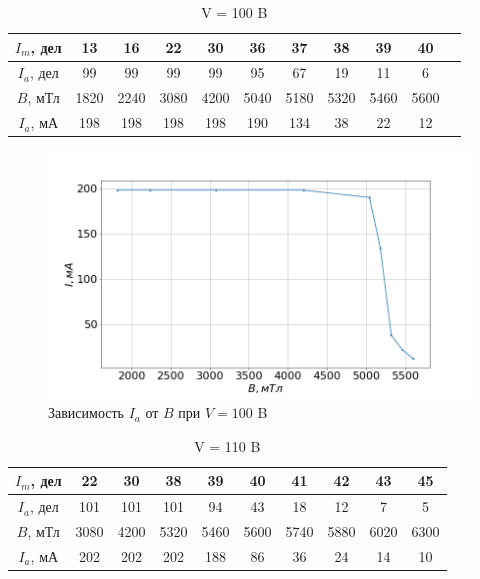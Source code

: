 \documentclass[a4paper, fontsize=14pt]{article}
\begin{document}
\begin{table}[H]

	\centering
\begin{tabular}{|c|c|c|c|c|c|c|c|c|c|c|}
     \hline
     $I_m$, дел &	13&	16&	22&	30&	36&	37&	38&	39&	40
\\ \hline
     $I_a$, дел &		99&	99&	99&	99&	95&	67&	19&	11&	6
\\ \hline
     $B$, мТл& 	1820&	2240&	3080&	4200&	5040&	5180&	5320&	5460&	5600
\\ \hline
$I_a$, мА & 	198&	198&	198&	198&	190&	134&	38&	22&	12
\\ \hline

\end{tabular}
	\caption{V = 100 B}
\end{table}

\begin{figure}[H]
\center
\includegraphics[scale=0.4]{4.png}
\caption{Зависимость $I_a$ от $B$ при $V = 100$ B}
\end{figure}

\begin{table}[H]

	\centering
\begin{tabular}{|c|c|c|c|c|c|c|c|c|c|}
     \hline
     $I_m$, дел &	22&	30&	38&	39&	40&	41&	42&	43&	45
\\ \hline
     $I_a$, дел &	101&	101&	101&	94&	43&	18&	12&	7&	5
 \\ \hline
     $B$, мТл&	3080&	4200&	5320&	5460&	5600&	5740&	5880&	6020&	6300
\\ \hline
$I_a$, мА &	202&	202&	202&	188&	86&	36&	24&	14&	10
\\ \hline

\end{tabular}
	\caption{V = 110 B}
\end{table}
\end{document}
